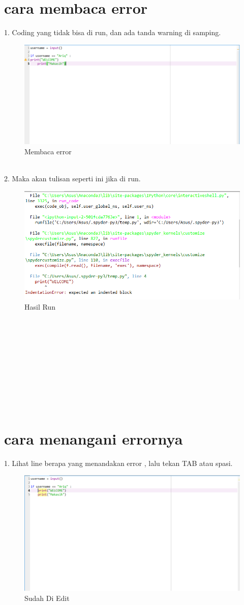 \documentclass[12pt, times new roman, a4paper]{article}
\begin{document}
\section{cara membaca error}
1. Coding yang tidak bisa di run, dan ada tanda warning di samping.
\begin{figure}[h]
	\centering
		\includegraphics[scale=0.4]{Gambar/E1}
	\caption{Membaca error}
\end{figure}
\\
2. Maka akan tulisan seperti ini jika di run.\\
\begin{figure}[h]
	\centering
		\includegraphics[scale=0.5]{Gambar/E2}
	\caption{Hasil Run}
\end{figure}
\\
\\
\\
\\
\\
\\
\\
\\
\\
\section{cara menangani errornya}
1. Lihat line berapa yang menandakan error , lalu tekan TAB atau spasi.
\begin{figure}[h]
	\centering
		\includegraphics[scale=0.4]{Gambar/E3}
	\caption{Sudah Di Edit}
\end{figure}
\end{document}
